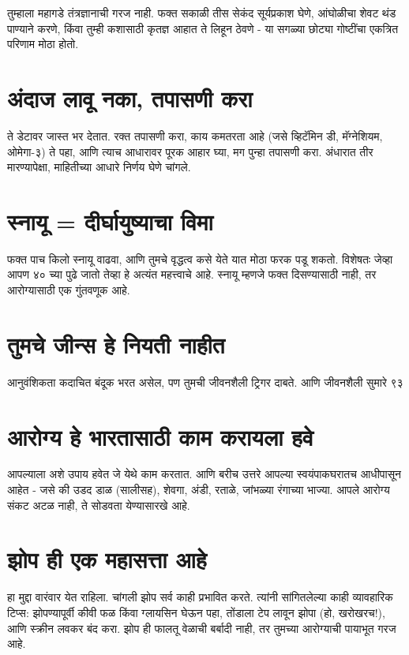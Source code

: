 तुम्हाला महागडे तंत्रज्ञानाची गरज नाही. फक्त सकाळी तीस सेकंद सूर्यप्रकाश घेणे, आंघोळीचा शेवट थंड पाण्याने करणे, किंवा तुम्ही कशासाठी कृतज्ञ आहात ते लिहून ठेवणे - या सगळ्या छोट्या गोष्टींचा एकत्रित परिणाम मोठा होतो.

\section*{अंदाज लावू नका, तपासणी करा}

ते डेटावर जास्त भर देतात. रक्त तपासणी करा, काय कमतरता आहे (जसे व्हिटॅमिन डी, मॅग्नेशियम, ओमेगा-३) ते पहा, आणि त्याच आधारावर पूरक आहार घ्या, मग पुन्हा तपासणी करा. अंधारात तीर मारण्यापेक्षा, माहितीच्या आधारे निर्णय घेणे चांगले.

\section*{स्नायू = दीर्घायुष्याचा विमा}

फक्त पाच किलो स्नायू वाढवा, आणि तुमचे वृद्धत्व कसे येते यात मोठा फरक पडू शकतो. विशेषतः जेव्हा आपण ४० च्या पुढे जातो तेव्हा हे अत्यंत महत्त्वाचे आहे. स्नायू म्हणजे फक्त दिसण्यासाठी नाही, तर आरोग्यासाठी एक गुंतवणूक आहे.

\section*{तुमचे जीन्स हे नियती नाहीत}

आनुवंशिकता कदाचित बंदूक भरत असेल, पण तुमची जीवनशैली ट्रिगर दाबते. आणि जीवनशैली सुमारे ९३%

\section*{आरोग्य हे भारतासाठी काम करायला हवे}

आपल्याला अशे उपाय हवेत जे येथे काम करतात. आणि बरीच उत्तरे आपल्या स्वयंपाकघरातच आधीपासून आहेत - जसे की उडद डाळ (सालीसह), शेवगा, अंडी, रताळे, जांभळ्या रंगाच्या भाज्या. आपले आरोग्य संकट अटळ नाही, ते सोडवता येण्यासारखे आहे.

\section*{झोप ही एक महासत्ता आहे}

हा मुद्दा वारंवार येत राहिला. चांगली झोप सर्व काही प्रभावित करते. त्यांनी सांगितलेल्या काही व्यावहारिक टिप्स: झोपण्यापूर्वी कीवी फळ किंवा ग्लायसिन घेऊन पहा, तोंडाला टेप लावून झोपा (हो, खरोखरच!), आणि स्क्रीन लवकर बंद करा. झोप ही फालतू वेळाची बर्बादी नाही, तर तुमच्या आरोग्याची पायाभूत गरज आहे.